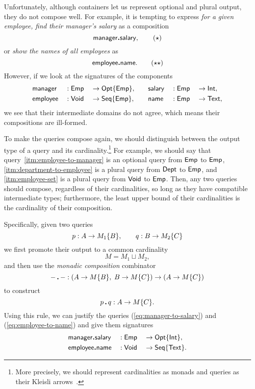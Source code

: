 Unfortunately, although containers let us represent optional and plural output,
they do not compose well.  For example, it is tempting to express \emph{for a
given employee, find their manager's salary} as a composition
\begin{equation} \label{eq:manager-to-salary}
    \mathsf{manager}\boldsymbol{.}\mathsf{salary}, \tag{$\star$}
\end{equation}
or \emph{show the names of all employees} as
\begin{equation} \label{eq:employee-to-name}
    \mathsf{employee}\boldsymbol{.}\mathsf{name}. \tag{$\star\star$}
\end{equation}
However, if we look at the signatures of the components
\begin{alignat*}{6}
    & \mathsf{manager} && : \mathsf{Emp} && \to \mathsf{Opt}{\left\{\mathsf{Emp}\right\}}, \quad && \mathsf{salary} && : \mathsf{Emp} && \to \mathsf{Int}, \\
    & \mathsf{employee} && : \mathsf{Void} && \to \mathsf{Seq}{\left\{\mathsf{Emp}\right\}}, \quad && \mathsf{name} && : \mathsf{Emp} && \to \mathsf{Text},
\end{alignat*}
we see that their intermediate domains do not agree, which means their
compositions are ill-formed.

To make the queries compose again, we should distinguish between the output
type of a query and its cardinality.\footnote{More precisely, we should
represent cardinalities as monads and queries as their Kleisli
arrows~\cite{Moggi1991}.} For example, we should say that
query~\ref{itm:employee-to-manager} is an optional query from $\mathsf{Emp}$ to $\mathsf{Emp}$,
\ref{itm:department-to-employee} is a plural query from $\mathsf{Dept}$ to $\mathsf{Emp}$, and
\ref{itm:employee-set} is a plural query from $\mathsf{Void}$ to $\mathsf{Emp}$.  Then, any two
queries should compose, regardless of their cardinalities, so long as they have
compatible intermediate types; furthermore, the least upper bound of their
cardinalities is the cardinality of their composition.

Specifically, given two queries
\begin{equation*}
    p : A \to M_1{\left\{B\right\}}, \qquad q : B \to M_2{\left\{C\right\}}
\end{equation*}
we first promote their output to a common cardinality
\begin{equation*}
    M = M_1 \sqcup M_2,
\end{equation*}
and then use the \emph{monadic composition} combinator
\begin{equation*}
    {-}\,\boldsymbol{.}\,{-} : (A \to M{\left\{B\right\}},\; B \to M{\left\{C\right\}}) \to (A \to M{\left\{C\right\}})
\end{equation*}
to construct
\begin{equation*}
    p\,\boldsymbol{.}\,q : A \to M{\left\{C\right\}}.
\end{equation*}
Using this rule, we can justify the queries (\ref{eq:manager-to-salary}) and
(\ref{eq:employee-to-name}) and give them signatures
\begin{alignat*}{3}
    & \mathsf{manager}\boldsymbol{.}\mathsf{salary} && : \mathsf{Emp} && \to \mathsf{Opt}{\left\{\mathsf{Int}\right\}}, \\
    & \mathsf{employee}\boldsymbol{.}\mathsf{name} && : \mathsf{Void} && \to \mathsf{Seq}{\left\{\mathsf{Text}\right\}}.
\end{alignat*}

